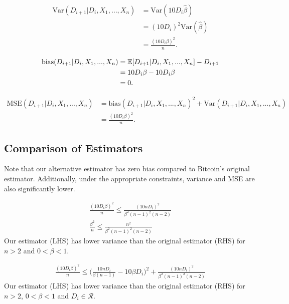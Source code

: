 \begin{align}
\text{Var}(D_{i+1} | D_{i}, X_1, \dots, X_{n}) &= \text{Var}(10 D_i \hat{\beta}) \\
&= (10 D_i)^2 \text{Var}(\hat{\beta}) \\
&= \frac{(10 D_i\beta)^2}{n}.
\end{align}

\begin{align}
\text{bias}(D_{i+1}|D_i,X_1,...,X_n) &= \operatorname{\mathbb{E}}[D_{i+1}|D_i,X_1,...,X_n] - D_{i+1} \\
&= 10 D_i\beta - 10 D_i\beta \\
&= 0.
\end{align}

\begin{align}
\text{MSE}(D_{i+1}|D_i,X_1,...,X_n) &= \text{bias}(D_{i+1}|D_i,X_1,...,X_n)^2 + \text{Var}(D_{i+1}|D_i,X_1,...,X_n) \\
&= \frac{(10 D_i\beta)^2}{n}.
\end{align}

\subsection{Comparison of Estimators}
Note that our alternative estimator has zero bias compared to Bitcoin's original estimator. Additionally, under the appropriate constraints, variance and MSE are also significantly lower.
\par \noindent {}
\begin{align}
\frac{(10 D_i\beta)^2}{n} \leq \frac{(10n D_i)^2}{\beta^2(n-1)^2(n-2)} \\
\frac{\beta^2}{n} \leq \frac{n^2}{\beta^2(n-1)^2(n-2)} 
\end{align}
Our estimator (LHS) has lower variance than the original estimator (RHS) for $n>2$ and $0<\beta<1$.

\begin{align}
\frac{(10 D_i\beta)^2}{n} \leq \Bigg(\frac{10n D_i}{\beta(n-1)} - 10\beta D_i\Bigg)^2 + \frac{(10n D_i)^2}{\beta^2(n-1)^2(n-2)}
\end{align}
Our estimator (LHS) has lower variance than the original estimator (RHS) for $n>2$, $0<\beta<1$ and $D_i \in \mathcal{R}$. 

